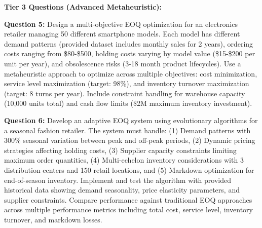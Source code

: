\documentclass{article}
\begin{document}
\textbf{Tier 3 Questions (Advanced Metaheuristic):}

\textbf{Question 5:} Design a multi-objective EOQ optimization for an electronics retailer managing 50 different smartphone models. Each model has different demand patterns (provided dataset includes monthly sales for 2 years), ordering costs ranging from \$80-\$500, holding costs varying by model value (\$15-\$200 per unit per year), and obsolescence risks (3-18 month product lifecycles). Use a metaheuristic approach to optimize across multiple objectives: cost minimization, service level maximization (target: 98\%), and inventory turnover maximization (target: 8 turns per year). Include constraint handling for warehouse capacity (10,000 units total) and cash flow limits (\$2M maximum inventory investment).

\textbf{Question 6:} Develop an adaptive EOQ system using evolutionary algorithms for a seasonal fashion retailer. The system must handle: (1) Demand patterns with 300\% seasonal variation between peak and off-peak periods, (2) Dynamic pricing strategies affecting holding costs, (3) Supplier capacity constraints limiting maximum order quantities, (4) Multi-echelon inventory considerations with 3 distribution centers and 150 retail locations, and (5) Markdown optimization for end-of-season inventory. Implement and test the algorithm with provided historical data showing demand seasonality, price elasticity parameters, and supplier constraints. Compare performance against traditional EOQ approaches across multiple performance metrics including total cost, service level, inventory turnover, and markdown losses.
\end{document}
